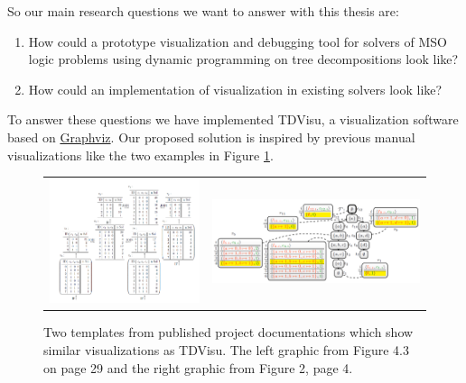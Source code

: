 \documentclass[a4paper, 12pt, bibliography=totoc]{scrartcl}
\begin{document}
So our main research questions we want to answer with this thesis are:
\begin{enumerate}
	\item How could a prototype visualization and debugging tool for solvers of MSO logic problems using dynamic programming on tree decompositions look like?
	\item How could an implementation of visualization in existing solvers look like?
\end{enumerate}
\noindent
To answer these questions we have implemented TDVisu, a visualization software based on \href{graphviz.org/}{Graphviz}. 
Our proposed solution is inspired by previous manual visualizations like the two examples in Figure \ref{fig:prevvisus}.
\begin{figure}[h]
	
	\centering
	\begin{tabularx}{\textwidth}{ X X }
		\includegraphics[width=1.05\linewidth,valign=c]{images/DualDA43.png} &  
		\includegraphics[width=1.02\linewidth,valign=c]{images/dpdbVisuSat.png}\\ 
		
	\end{tabularx}	
	
	\caption{Two templates from published project documentations which show similar visualizations as TDVisu. The left graphic from \cite{DiplomarbeitZisser} Figure 4.3 on page 29 and the right graphic from \cite{dpdbpadl2020} Figure 2, page 4.}
	\label{fig:prevvisus}
\end{figure}
\end{document}
